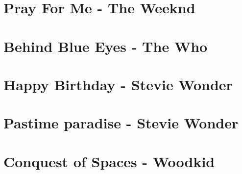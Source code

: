 \documentclass[11pt]{article}
\begin{document}
\section{Pray For Me - The Weeknd}
\begin{guitar}

\end{guitar}



\section{Behind Blue Eyes - The Who}
\begin{guitar}

\end{guitar}

\section{Happy Birthday - Stevie Wonder}
\begin{guitar}

\end{guitar}



\section{Pastime paradise - Stevie Wonder}
\begin{guitar}

\end{guitar}





\section{Conquest of Spaces - Woodkid}
\begin{guitar}

\end{guitar}
\end{document}
